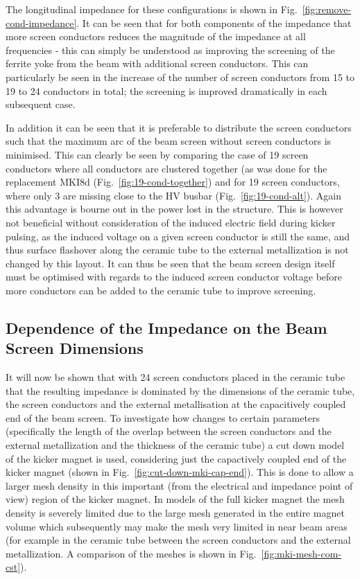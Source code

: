 The longitudinal impedance for these configurations is shown in Fig.~\ref{fig:remove-cond-impedance}. It can be seen that for both components of the impedance that more screen conductors reduces the magnitude of the impedance at all frequencies - this can simply be understood as improving the screening of the ferrite yoke from the beam with additional screen conductors. This can particularly be seen in the increase of the number of screen conductors from 15 to 19 to 24 conductors in total; the screening is improved dramatically in each subsequent case. 

In addition it can be seen that it is preferable to distribute the screen conductors such that the maximum arc of the beam screen without screen conductors is minimised. This can clearly be seen by comparing the case of 19 screen conductors where all conductors are clustered together (as was done for the replacement MKI8d (Fig.~\ref{fig:19-cond-together}) and for 19 screen conductors, where only 3 are missing close to the HV busbar (Fig.~\ref{fig:19-cond-alt}). Again this advantage is bourne out in the power lost in the structure. This is however not beneficial without consideration of the induced electric field during kicker pulsing, as the induced voltage on a given screen conductor is still the same, and thus surface flashover along the ceramic tube to the external metallization is not changed by this layout. It can thus be seen that the beam screen design itself must be optimised with regards to the induced screen conductor voltage before more conductors can be added to the ceramic tube to improve screening.

\subsection{Dependence of the Impedance on the Beam Screen Dimensions}

It will now be shown that with 24 screen conductors placed in the ceramic tube that the resulting impedance is dominated by the dimensions of the ceramic tube, the screen conductors and the external metallisation at the capacitively coupled end of the beam screen. To investigate how changes to certain parameters (specifically the length of the overlap between the screen conductors and the external metallization and the thickness of the ceramic tube) a cut down model of the kicker magnet is used, considering just the capactively coupled end of the kicker magnet (shown in Fig.~\ref{fig:cut-down-mki-cap-end}). This is done to allow a larger mesh density in this important (from the electrical and impedance point of view) region of the kicker magnet. In models of the full kicker magnet the mesh density is severely limited due to the large mesh generated in the entire magnet volume which subsequently may make the mesh very limited in near beam areas (for example in the ceramic tube between the screen conductors and the external metallization. A comparison of the meshes is shown in Fig.~\ref{fig:mki-mesh-com-cst}). 

